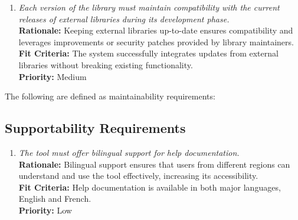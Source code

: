 \documentclass[12pt]{article}
\begin{document}
\begin{enumerate}[label=MS-MNT \arabic*., wide=0pt, leftmargin=*]
  \item \emph{Each version of the library must maintain compatibility with the current releases of external libraries during its development phase.}\\
  {\bf Rationale:} Keeping external libraries up-to-date ensures compatibility and leverages improvements or security patches provided by library maintainers.\\
  {\bf Fit Criteria:} The system successfully integrates updates from external libraries without breaking existing functionality.\\
  {\bf Priority:} Medium

\end{enumerate}

The following are defined as maintainability requirements:
\subsection{Supportability Requirements}
\begin{enumerate}[label=MS-SP \arabic*., wide=0pt, leftmargin=*]
  \item \emph{The tool must offer bilingual support for help documentation.}\\
  {\bf Rationale:} Bilingual support ensures that users from different regions can understand and use the tool effectively, increasing its accessibility.\\
  {\bf Fit Criteria:} Help documentation is available in both major languages, English and French.\\
  {\bf Priority:} Low
\end{enumerate}
\end{document}
